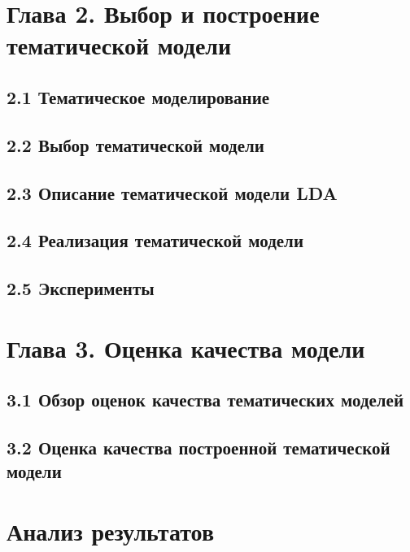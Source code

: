 \documentclass[a4paper]{report}
\begin{document}
	\newpage
	\section{Глава 2. Выбор и построение тематической модели}
	\subsection{2.1 Тематическое моделирование}
	\subsection{2.2 Выбор тематической модели}
	\subsection{2.3 Описание тематической модели LDA}
	\subsection{2.4 Реализация тематической модели}
	\subsection{2.5 Эксперименты}
	
	
	\newpage
	\section{Глава 3. Оценка качества модели}
	\subsection{3.1 Обзор оценок качества тематических моделей}
	\subsection{3.2 Оценка качества построенной тематической модели}
	
	\section{Анализ результатов}
	
	
	
	
\end{document}
